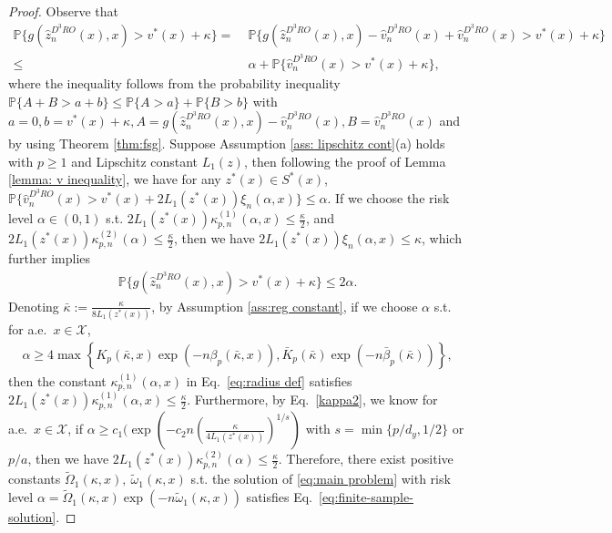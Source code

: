 \documentclass[onefignum,onetabnum]{siamart251216}
\begin{document}
\begin{proof}\label{proof prop 5}
    Observe that
    \small
    \begin{align*}
        \mathbb{P} \big\{g(\hat{z}_n^{D^3RO}(x),x) > v^*(x) + \kappa\big\}
        =&\; \mathbb{P} \big\{g(\hat{z}_n^{D^3RO}(x),x) - \hat{v}_n^{D^3RO}(x) + \hat{v}_n^{D^3RO}(x) > v^*(x) + \kappa\big\} 
        \\
         \leq &\; \alpha + \mathbb{P} \big\{\hat{v}_n^{D^3RO}(x) > v^*(x) + \kappa\big\},
    \end{align*}
    \normalsize
    where the inequality follows from the probability inequality $\mathbb P\{A + B>a+b\} \le \mathbb P\{A>a\} + \mathbb P\{B>b\}$ with $a=0, b=v^*(x) + \kappa, A=g(\hat{z}_n^{D^3RO}(x),x) - \hat{v}_n^{D^3RO}(x), B=\hat{v}_n^{D^3RO}(x)$ and by using Theorem \ref{thm:fsg}. Suppose Assumption \ref{ass: lipschitz cont}(a) holds with $p \geq 1$ and Lipschitz constant $L_1(z)$, then following the proof of Lemma \ref{lemma: v inequality}, we have for any $z^*(x) \in S^*(x)$, $\mathbb{P} \{\hat{v}_n^{D^3RO}(x) > v^*(x) + 2L_1(z^*(x))\xi_n(\alpha,x)\} \leq \alpha$. If we choose the risk level $\alpha \in (0,1)$ s.t. $2L_1(z^*(x)) \kappa_{p,n}^{(1)}(\alpha,x) \leq \frac{\kappa}{2}$, and $2L_1(z^*(x)) \kappa_{p,n}^{(2)}(\alpha) \leq \frac{\kappa}{2}$, then we have $2L_1(z^*(x))\xi_n(\alpha,x) \leq \kappa$, which further implies
    \begin{align}
        \mathbb{P}\{g(\hat{z}_n^{D^3RO}(x),x) > v^*(x) + \kappa\} \leq 2\alpha.\label{eq:proposition-5}
    \end{align}
    Denoting $\bar{\kappa}:=\frac{\kappa}{8L_1(z^*(x))}$, by Assumption \ref{ass:reg constant}, if we choose $\alpha$ s.t. for a.e.\ $x \in \mathcal{X}$, 
    \begin{align*}
        \alpha \geq 4\max\left\{K_{p}(\bar{\kappa},x) \exp (-n \beta_{p} (\bar{\kappa},x)),\bar{K}_{p}(\bar{\kappa}) \exp (-n \bar{\beta}_{p} (\bar{\kappa}))\right\},
    \end{align*} 
    then the constant $\kappa_{p,n}^{(1)}(\alpha,x)$ in Eq.~\eqref{eq:radius def} satisfies $2L_1(z^*(x)) \kappa_{p,n}^{(1)} (\alpha,x) \leq \frac{\kappa}{2}$. Furthermore, by Eq.~\eqref{kappa2}, we know for a.e.\ $x \in \mathcal{X}$, if $\alpha \geq c_1(\exp(-c_2 n (\frac{\kappa}{4L_1(z^*(x))})^{1/s})$ with $s = \min\{p/d_y,1/2\}$ or $p/a$, then we have $2L_1(z^*(x)) \kappa_{p,n}^{(2)}(\alpha) \leq \frac{\kappa}{2}$. Therefore, there exist positive constants $\tilde{\Omega}_1(\kappa,x),\ \tilde{\omega}_1(\kappa,x)$ s.t. the solution of \eqref{eq:main problem} with risk level $\alpha = \tilde{\Omega}_1(\kappa,x) \exp{(-n \tilde{\omega}_1(\kappa,x))}$ satisfies Eq.~\eqref{eq:finite-sample-solution}.


\end{proof}
\end{document}
